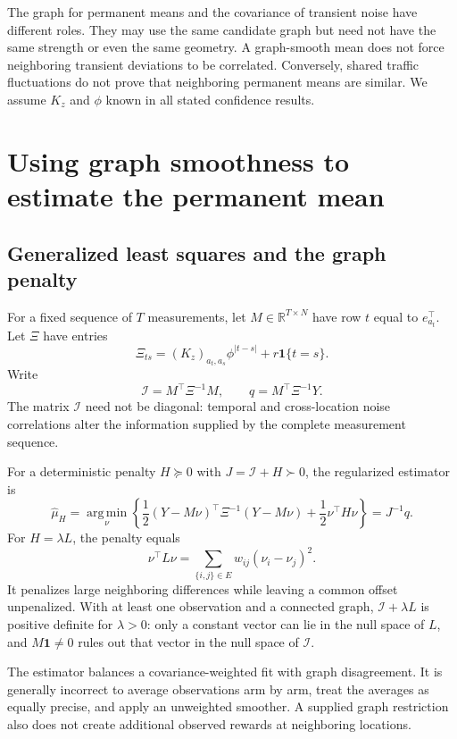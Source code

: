\documentclass[11pt]{article}
\newcommand{\argmin}{\operatorname*{arg\,min}}
\newcommand{\one}{\mathbf1}
\begin{document}
The graph for permanent means and the covariance of transient noise have different roles. They may use the same candidate graph but need not have the same strength or even the same geometry. A graph-smooth mean does not force neighboring transient deviations to be correlated. Conversely, shared traffic fluctuations do not prove that neighboring permanent means are similar. We assume $K_z$ and $\phi$ known in all stated confidence results.

\section{Using graph smoothness to estimate the permanent mean}
\subsection{Generalized least squares and the graph penalty}
For a fixed sequence of $T$ measurements, let $M\in\mathbb R^{T\times N}$ have row $t$ equal to $e_{a_t}^\top$. Let $\Xi$ have entries
\begin{equation}
\Xi_{ts}=(K_z)_{a_t,a_s}\phi^{|t-s|}+r\one\{t=s\}.
\label{eq:xi}
\end{equation}
Write
\begin{equation}
\mathcal I=M^\top\Xi^{-1}M,\qquad q=M^\top\Xi^{-1}Y.
\label{eq:information}
\end{equation}
The matrix $\mathcal I$ need not be diagonal: temporal and cross-location noise correlations alter the information supplied by the complete measurement sequence.

For a deterministic penalty $H\succeq0$ with $J=\mathcal I+H\succ0$, the regularized estimator is
\begin{equation}
\widehat\mu_H=\argmin_\nu\left\{\frac12(Y-M\nu)^\top\Xi^{-1}(Y-M\nu)
+\frac12\nu^\top H\nu\right\}=J^{-1}q.
\label{eq:ridge}
\end{equation}
For $H=\lambda L$, the penalty equals
\begin{equation}
\nu^\top L\nu=\sum_{\{i,j\}\in E}w_{ij}(\nu_i-\nu_j)^2.
\end{equation}
It penalizes large neighboring differences while leaving a common offset unpenalized. With at least one observation and a connected graph, $\mathcal I+\lambda L$ is positive definite for $\lambda>0$: only a constant vector can lie in the null space of $L$, and $M\one\ne0$ rules out that vector in the null space of $\mathcal I$.

The estimator balances a covariance-weighted fit with graph disagreement. It is generally incorrect to average observations arm by arm, treat the averages as equally precise, and apply an unweighted smoother. A supplied graph restriction also does not create additional observed rewards at neighboring locations.
\end{document}
